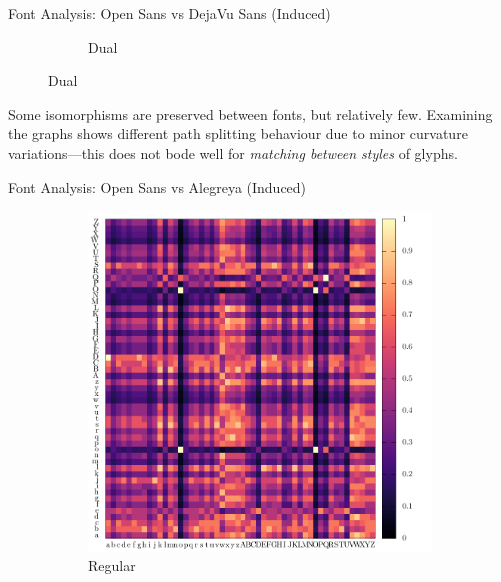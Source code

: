 \documentclass[10pt]{beamer}
\begin{document}
\begin{frame}{Font Analysis: Open Sans vs DejaVu Sans (Induced)}
\begin{figure}
\begin{subfigure}[b]{0.4\linewidth}
			\caption{
				Dual
			}
		\end{subfigure}
	\end{figure}

	Some isomorphisms are preserved between fonts, but relatively few.
	Examining the graphs shows different path splitting behaviour due to minor curvature variations---this does not bode well for \emph{matching between styles} of glyphs.
	
\end{frame}

\begin{frame}{Font Analysis: Open Sans vs Alegreya (Induced)}
	\begin{figure}
		\centering
		\begin{subfigure}[b]{0.4\linewidth}
			\includegraphics[width=\linewidth, height=0.9\linewidth]{../tables/alegreya-dejavu-sans/induced-conf-nrm.pdf}
			\caption{
				Regular
			}
		\end{subfigure}
		\begin{subfigure}[b]{0.4\linewidth}

\end{subfigure}
\end{figure}
\end{frame}
\end{document}
